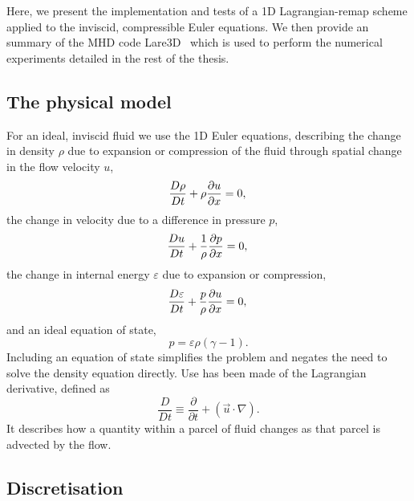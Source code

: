 Here, we present the implementation and tests of a 1D Lagrangian-remap scheme applied to the inviscid, compressible Euler equations. We then provide an summary of the MHD code Lare3D~\cite{arberStaggeredGridLagrangian2001} which is used to perform the numerical experiments detailed in the rest of the thesis. 

\subsection{The physical model}
For an ideal, inviscid fluid we use the 1D Euler equations, describing the change in density $\rho$ due to expansion or compression of the fluid through spatial change in the flow velocity $u$,
\begin{equation}
  \frac{D \rho}{Dt} + \rho\frac{\partial u}{\partial x} = 0,\\
  \label{eqn-lare1d-density}
\end{equation}
the change in velocity due to a difference in pressure $p$,
\begin{equation}
  \frac{D u}{Dt} + \frac{1}{\rho}\frac{\partial p}{\partial x} = 0,\\
  \label{eqn-lare1d-velocity}
\end{equation}
the change in internal energy $\varepsilon$ due to expansion or compression,
\begin{equation}
  \frac{D \varepsilon}{Dt} + \frac{p}{\rho}\frac{\partial u}{\partial x} = 0,\\
  \label{eqn-lare1d-energy}
\end{equation}
and an ideal equation of state,
\begin{equation}
  p = \varepsilon\rho(\gamma - 1).
  \label{eqn-lare1d-equation-of-state}
\end{equation}
Including an equation of state simplifies the problem and negates the need to solve the density equation directly. Use has been made of the Lagrangian derivative, defined as
\begin{equation}
  \frac{D }{Dt} \equiv \frac{\partial}{\partial t} + (\vec{u} \cdot \nabla).
\end{equation}
It describes how a quantity within a parcel of fluid changes as that parcel is advected by the flow. 

\subsection{Discretisation} 

